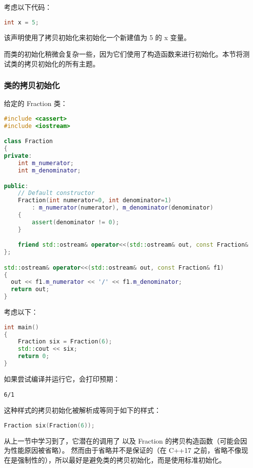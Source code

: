 \documentclass[../../LearnCpp.tex]{subfiles}
\begin{document}

考虑以下代码：

\begin{lstlisting}[language=C++]
int x = 5;
\end{lstlisting}

该声明使用了拷贝初始化来初始化一个新建值为 5 的 x 变量。

而类的初始化稍微会复杂一些，因为它们使用了构造函数来进行初始化。本节将测试类的拷贝初始化的所有主题。

\subsubsection*{类的拷贝初始化}

给定的 Fraction 类：

\begin{lstlisting}[language=C++]
#include <cassert>
#include <iostream>

class Fraction
{
private:
    int m_numerator;
    int m_denominator;

public:
    // Default constructor
    Fraction(int numerator=0, int denominator=1)
        : m_numerator(numerator), m_denominator(denominator)
    {
        assert(denominator != 0);
    }

    friend std::ostream& operator<<(std::ostream& out, const Fraction& f1);
};

std::ostream& operator<<(std::ostream& out, const Fraction& f1)
{
  out << f1.m_numerator << '/' << f1.m_denominator;
  return out;
}
\end{lstlisting}

考虑以下：

\begin{lstlisting}[language=C++]
int main()
{
    Fraction six = Fraction(6);
    std::cout << six;
    return 0;
}
\end{lstlisting}

如果尝试编译并运行它，会打印预期：

\begin{lstlisting}
6/1
\end{lstlisting}

这种样式的拷贝初始化被解析成等同于如下的样式：

\begin{lstlisting}[language=C++]
Fraction six(Fraction(6));
\end{lstlisting}

从上一节中学习到了，它潜在的调用了  以及 Fraction 的拷贝构造函数（可能会因为性能原因被省略）。
然而由于省略并不是保证的（在 C++17 之前，省略不像现在是强制性的），所以最好是避免类的拷贝初始化，而是使用标准初始化。
\end{document}
